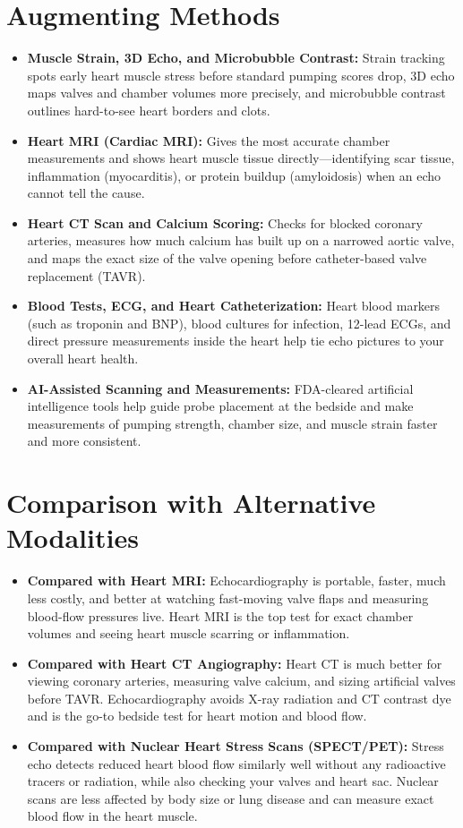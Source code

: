 \section{Augmenting Methods}
\begin{itemize}
\item \textbf{Muscle Strain, 3D Echo, and Microbubble Contrast:} Strain tracking spots early heart muscle stress before standard pumping scores drop, 3D echo maps valves and chamber volumes more precisely, and microbubble contrast outlines hard-to-see heart borders and clots.
\item \textbf{Heart MRI (Cardiac MRI):} Gives the most accurate chamber measurements and shows heart muscle tissue directly---identifying scar tissue, inflammation (myocarditis), or protein buildup (amyloidosis) when an echo cannot tell the cause.
\item \textbf{Heart CT Scan and Calcium Scoring:} Checks for blocked coronary arteries, measures how much calcium has built up on a narrowed aortic valve, and maps the exact size of the valve opening before catheter-based valve replacement (TAVR).
\item \textbf{Blood Tests, ECG, and Heart Catheterization:} Heart blood markers (such as troponin and BNP), blood cultures for infection, 12-lead ECGs, and direct pressure measurements inside the heart help tie echo pictures to your overall heart health.
\item \textbf{AI-Assisted Scanning and Measurements:} FDA-cleared artificial intelligence tools help guide probe placement at the bedside and make measurements of pumping strength, chamber size, and muscle strain faster and more consistent.
\end{itemize}

\section{Comparison with Alternative Modalities}
\begin{itemize}
\item \textbf{Compared with Heart MRI:} Echocardiography is portable, faster, much less costly, and better at watching fast-moving valve flaps and measuring blood-flow pressures live. Heart MRI is the top test for exact chamber volumes and seeing heart muscle scarring or inflammation.
\item \textbf{Compared with Heart CT Angiography:} Heart CT is much better for viewing coronary arteries, measuring valve calcium, and sizing artificial valves before TAVR. Echocardiography avoids X-ray radiation and CT contrast dye and is the go-to bedside test for heart motion and blood flow.
\item \textbf{Compared with Nuclear Heart Stress Scans (SPECT/PET):} Stress echo detects reduced heart blood flow similarly well without any radioactive tracers or radiation, while also checking your valves and heart sac. Nuclear scans are less affected by body size or lung disease and can measure exact blood flow in the heart muscle.
\end{itemize}

